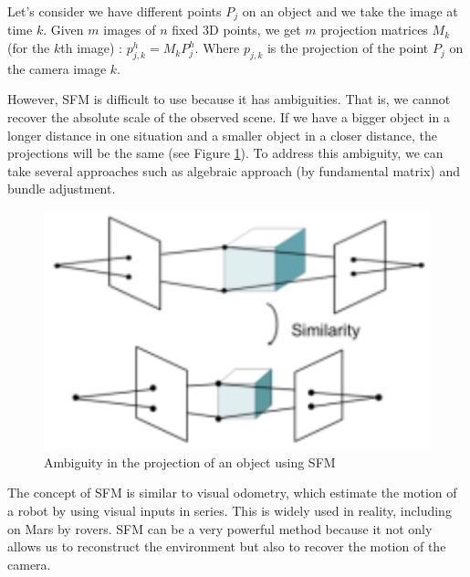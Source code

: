 \documentclass[twoside]{article}
\begin{document}
Let's consider we have different points $P_j$ on an object and we take the image at time $k$. Given $m$ images of $n$ fixed 3D points, we get $m$ projection matrices $M_k$ (for the $k$th image) : $p_{j,k}^h = M_k P_j^h$.
Where $p_{j,k}$ is the projection of the point $P_j$ on the camera image $k$.

However, SFM is difficult to use because it has ambiguities. That is, we cannot recover the absolute scale of the observed scene. If we have a bigger object in a longer distance in one situation and a smaller object in a closer distance, the projections will be the same (see Figure \ref{amb}). To address this ambiguity, we can take several approaches such as algebraic approach (by fundamental matrix) and bundle adjustment. 

\begin{figure}[h!]
  \begin{center}
	\includegraphics[scale=0.8]{SFM_ambiguities.png}  
  \end{center}
  \caption{Ambiguity in the projection of an object using SFM} 
  \label{amb}
\end{figure}

The concept of SFM is similar to visual odometry, which estimate the motion of a robot by using visual inputs in series. This is widely used in reality, including on Mars by rovers. SFM can be a very powerful method because it not only allows us to reconstruct the environment but also to recover the motion of the camera.

\newpage



\end{document}
